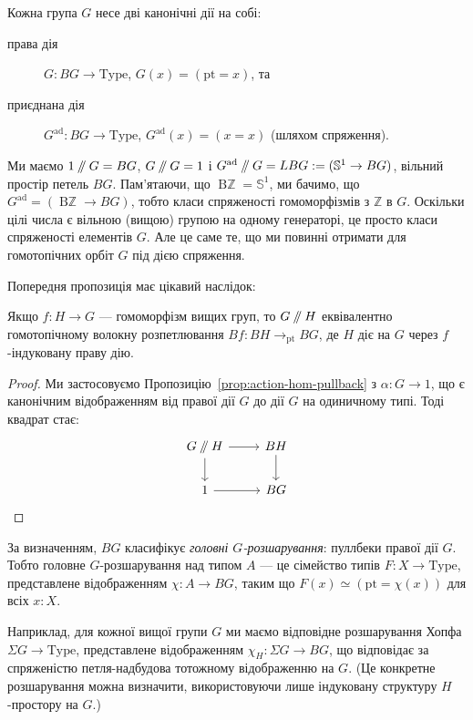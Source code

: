 \documentclass[12pt]{article}
\newcommand*{\susp}[1]{{\Sigma}{#1}}
\newcommand*{\bZ}{{\mathbb{Z}}}
\newcommand*{\bS}{{\mathbb{S}}}
\newcommand*{\pt}{{\mathrm{pt}}}
\newcommand*{\dblslash}{\mathbin{/\kern-3pt/}}
\renewcommand*{\equiv}{\mathrel{\simeq}}
\newcommand*\BZ{\mathop{\mathrm{B}\bZ}}
\newcommand*{\Type}{\mathrm{Type}}
\begin{document}
Кожна група $G$ несе дві канонічні дії на собі:
\begin{description}
\item[права дія] $G : BG \to \Type$, $G(x) = (\pt = x)$, та
\item[приєднана дія] $G^{\mathrm{ad}} : BG \to \Type$, $G^{\mathrm{ad}}(x) = (x = x)$ (шляхом спряження).
\end{description}

Ми маємо $1 \dblslash G = BG$, $G \dblslash G = 1$ і $G^{\mathrm{ad}} \dblslash G = LBG := (\bS^1 \to BG)$, вільний простір петель $BG$. Пам’ятаючи, що $\BZ = \bS^1$, ми бачимо, що $G^{\mathrm{ad}} = (\BZ \to BG)$, тобто класи спряженості гомоморфізмів з $\bZ$ в $G$. Оскільки цілі числа є вільною (вищою) групою на одному генераторі, це просто класи спряженості елементів $G$. Але це саме те, що ми повинні отримати для гомотопічних орбіт $G$ під дією спряження.

Попередня пропозиція має цікавий наслідок:
\begin{corollary}
  \label{cor:hfiber-hom}
  Якщо $f : H \to G$ — гомоморфізм вищих груп, то $G \dblslash H$ еквівалентно гомотопічному волокну розпетлювання $Bf : BH \to_\pt BG$, де $H$ діє на $G$ через $f$-індуковану праву дію.
\end{corollary}

\begin{proof}
  Ми застосовуємо Пропозицію~\ref{prop:action-hom-pullback} з $\alpha : G \to 1$, що є канонічним відображенням від правої дії $G$ до дії $G$ на одиничному типі. Тоді квадрат стає:
  \[
    \begin{tikzcd}[baseline=(O.base)]
      G \dblslash H \ar[r]\ar[d] & BH\ar[d] \\
      |[alias=O]| 1 \ar[r]       & BG
    \end{tikzcd}\qedhere
  \]
\end{proof}

За визначенням, $BG$ класифікує \emph{головні $G$-розшарування}: пуллбеки правої дії $G$. Тобто головне $G$-розшарування над типом $A$ — це сімейство типів $F : X \to \Type$, представлене відображенням $\chi : A \to BG$, таким що $F(x) \equiv (\pt = \chi(x))$ для всіх $x : X$.

Наприклад, для кожної вищої групи $G$ ми маємо відповідне розшарування Хопфа $\susp G \to \Type$, представлене відображенням $\chi_H : \susp G \to BG$, що відповідає за спряженістю петля-надбудова тотожному відображенню на $G$. (Це конкретне розшарування можна визначити, використовуючи лише індуковану структуру $H$-простору на $G$.)
\end{document}
